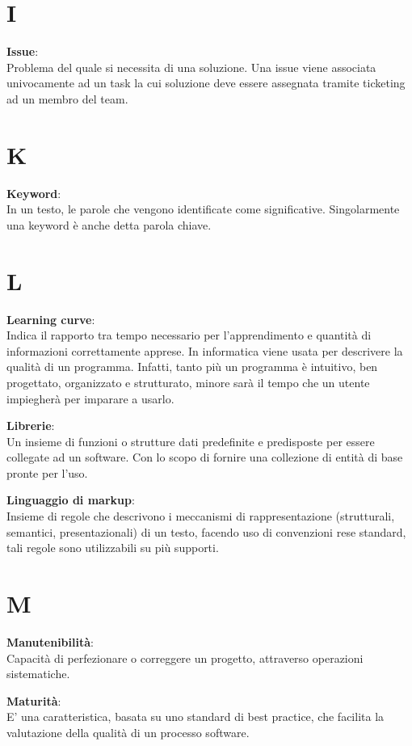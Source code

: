 \documentclass[a4paper, oneside, openany, dvipsnames, table]{article}
\begin{document}
\newpage
\section{I}
\textbf{Issue}:\\ Problema del quale si necessita di una soluzione. Una issue viene associata univocamente ad un task la cui soluzione deve essere assegnata tramite ticketing ad un membro del team.


\newpage
\section{K}
\textbf{Keyword}:\\	In un testo, le parole che vengono identificate come significative. Singolarmente una keyword è anche detta parola chiave.

\newpage
\section{L}
\textbf{Learning curve}:\\ Indica il rapporto tra tempo necessario per l'apprendimento e quantità di informazioni correttamente apprese. In informatica viene usata per descrivere la qualità di un programma. Infatti, tanto più un programma è intuitivo, ben progettato, organizzato e strutturato, minore sarà il tempo che un utente impiegherà per imparare a usarlo. 

\textbf{Librerie}:\\ Un insieme di funzioni o strutture dati predefinite e predisposte per essere collegate ad un software. Con lo scopo di fornire una collezione di entità di base pronte per l'uso.

\textbf{Linguaggio di markup}:\\  Insieme di regole che descrivono i meccanismi di rappresentazione (strutturali, semantici, presentazionali) di un testo, facendo uso di convenzioni rese standard, tali regole sono utilizzabili su più supporti.

\newpage
\section{M}
\textbf{Manutenibilità}:\\ Capacità di perfezionare o correggere un progetto, attraverso operazioni sistematiche.

\textbf{Maturità}:\\ E' una caratteristica, basata su uno standard di best practice, che facilita la valutazione della qualità di un processo software. 
\end{document}
